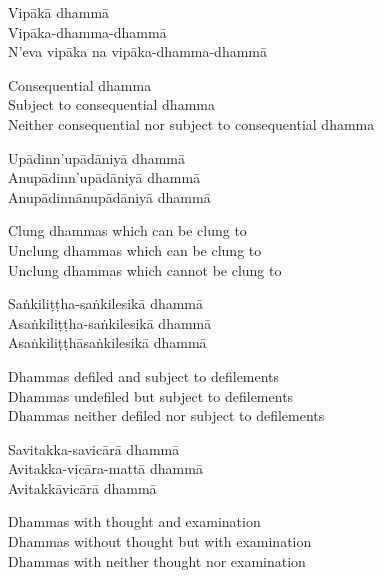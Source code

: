 \begin{pali-hang-continued}
Vipākā dhammā\\
Vipāka-dhamma-dhammā\\
N'eva vipāka na vipāka-dhamma-dhammā
\end{pali-hang-continued}

\begin{english-verses}
  Consequential dhamma\\
  Subject to consequential dhamma\\
  Neither consequential nor subject to consequential dhamma
\end{english-verses}

\begin{pali-hang-continued}
Upādinn'upādāniyā dhammā\\
Anupādinn'upādāniyā dhammā\\
Anupādinnānupādāniyā dhammā
\end{pali-hang-continued}

\begin{english-verses}
  Clung dhammas which can be clung to\\
  Unclung dhammas which can be clung to\\
  Unclung dhammas which cannot be clung to
\end{english-verses}

\begin{pali-hang-continued}
Saṅkiliṭṭha-saṅkilesikā dhammā\\
Asaṅkiliṭṭha-saṅkilesikā dhammā\\
Asaṅkiliṭṭhāsaṅkilesikā dhammā
\end{pali-hang-continued}

\begin{english-verses}
  Dhammas defiled and subject to defilements\\
  Dhammas undefiled but subject to defilements\\
  Dhammas neither defiled nor subject to defilements
\end{english-verses}

\begin{pali-hang-continued}
Savitakka-savicārā dhammā\\
Avitakka-vicāra-mattā dhammā\\
Avitakkāvicārā dhammā
\end{pali-hang-continued}

\begin{english-verses}
  Dhammas with thought and examination\\
  Dhammas without thought but with examination\\
  Dhammas with neither thought nor examination
\end{english-verses}

